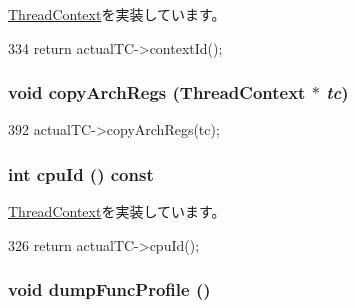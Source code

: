 \hyperlink{classThreadContext_a5a3ce3f955d2ec16ac6f2aa21e42f3a0}{ThreadContext}を実装しています。


\begin{DoxyCode}
334 { return actualTC->contextId(); }
\end{DoxyCode}
\hypertarget{classProxyThreadContext_a01b372f805c92c90e6148b76d23d6236}{
\subsubsection[{copyArchRegs}]{\setlength{\rightskip}{0pt plus 5cm}void copyArchRegs ({\bf ThreadContext} $\ast$ {\em tc})}}
\label{classProxyThreadContext_a01b372f805c92c90e6148b76d23d6236}



\begin{DoxyCode}
392 { actualTC->copyArchRegs(tc); }
\end{DoxyCode}
\hypertarget{classProxyThreadContext_a1e2d18ebf4e21f2416c21a8b072e2c7b}{
\subsubsection[{cpuId}]{\setlength{\rightskip}{0pt plus 5cm}int cpuId () const}}
\label{classProxyThreadContext_a1e2d18ebf4e21f2416c21a8b072e2c7b}


\hyperlink{classThreadContext_a7272bc1f752a9f60ab0358a09cc96f97}{ThreadContext}を実装しています。


\begin{DoxyCode}
326 { return actualTC->cpuId(); }
\end{DoxyCode}
\hypertarget{classProxyThreadContext_a13fa12d1779a94a1e0b968946a1367c7}{
\subsubsection[{dumpFuncProfile}]{\setlength{\rightskip}{0pt plus 5cm}void dumpFuncProfile ()}}
\label{classProxyThreadContext_a13fa12d1779a94a1e0b968946a1367c7}



